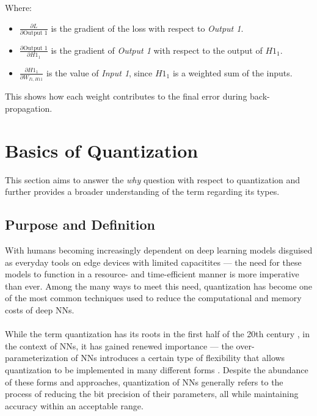 \noindent Where:
\begin{itemize}
    \item \( \frac{\partial L}{\partial \text{Output 1}} \) is the gradient of the loss with respect to \textit{Output 1}.
    \item \( \frac{\partial \text{Output 1}}{\partial H1_1} \) is the gradient of \textit{Output 1} with respect to the output of \( H1_1 \).
    \item \( \frac{\partial H1_1}{\partial W_{I1,H11}} \) is the value of \textit{Input 1}, since \( H1_1 \) is a weighted sum of the inputs.
\end{itemize}

\noindent This shows how each weight contributes to the final error during back-propagation.


\section{Basics of Quantization}
\label{sec:section2}
This section aims to answer the \textit{why} question with respect to quantization and further provides a broader understanding of the term regarding its types.

\subsection{Purpose and Definition}
\label{subsec:subsection1}
With humans becoming increasingly dependent on deep learning models disguised as everyday tools on edge devices with 
limited capacitites — the need for these models to function in a resource- and 
time-efficient manner is more imperative than ever. Among the many ways to meet this need, 
quantization has become one of the most common techniques used to reduce the computational 
and memory costs of deep NNs.
\\
\\
While the term quantization has its roots in the first half of the 20th century \cite{gray1998quantization}, in the context of NNs, 
it has gained renewed importance  — the over-parameterization of NNs introduces a certain type of flexibility 
that allows quantization to be implemented in many different forms \cite{gholami2021survey}.
Despite the abundance of these forms and approaches, quantization of NNs generally refers to the process of 
reducing the bit precision of their parameters, all while maintaining accuracy within an acceptable range.

